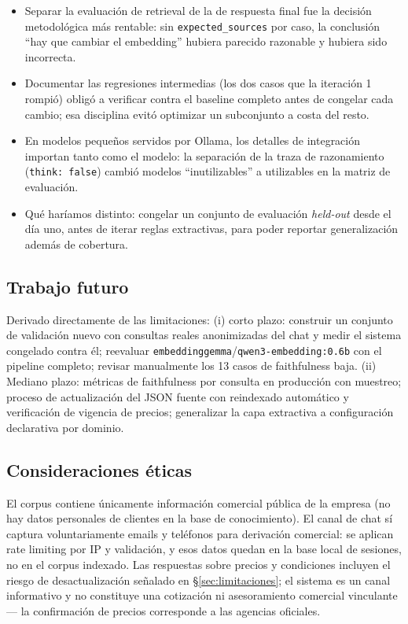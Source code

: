 \documentclass[11pt,a4paper]{article}
\newcommand{\code}[1]{\texttt{#1}}
\begin{document}
\begin{itemize}
    \item Separar la evaluación de retrieval de la de respuesta final fue la
    decisión metodológica más rentable: sin \code{expected\_sources} por
    caso, la conclusión ``hay que cambiar el embedding'' hubiera parecido
    razonable y hubiera sido incorrecta.
    \item Documentar las regresiones intermedias (los dos casos que la
    iteración 1 rompió) obligó a verificar contra el baseline completo antes
    de congelar cada cambio; esa disciplina evitó optimizar un subconjunto a
    costa del resto.
    \item En modelos pequeños servidos por Ollama, los detalles de
    integración importan tanto como el modelo: la separación de la traza de
    razonamiento (\code{think: false}) cambió modelos ``inutilizables'' a
    utilizables en la matriz de evaluación.
    \item Qué haríamos distinto: congelar un conjunto de evaluación
    \emph{held-out} desde el día uno, antes de iterar reglas extractivas,
    para poder reportar generalización además de cobertura.
\end{itemize}

\subsection{Trabajo futuro}

Derivado directamente de las limitaciones: (i) corto plazo: construir un
conjunto de validación nuevo con consultas reales anonimizadas del chat y
medir el sistema congelado contra él; reevaluar
\code{embeddinggemma}/\code{qwen3-embedding:0.6b} con el pipeline completo;
revisar manualmente los 13 casos de faithfulness baja. (ii) Mediano plazo:
métricas de faithfulness por consulta en producción con muestreo; proceso de
actualización del JSON fuente con reindexado automático y verificación de
vigencia de precios; generalizar la capa extractiva a configuración
declarativa por dominio.

\subsection{Consideraciones éticas}

El corpus contiene únicamente información comercial pública de la empresa
(no hay datos personales de clientes en la base de conocimiento). El canal de
chat sí captura voluntariamente emails y teléfonos para derivación comercial:
se aplican rate limiting por IP y validación, y esos datos quedan en la base
local de sesiones, no en el corpus indexado. Las respuestas sobre precios y
condiciones incluyen el riesgo de desactualización señalado en
§\ref{sec:limitaciones}; el sistema es un canal informativo y no constituye
una cotización ni asesoramiento comercial vinculante --- la confirmación de
precios corresponde a las agencias oficiales.
\end{document}
